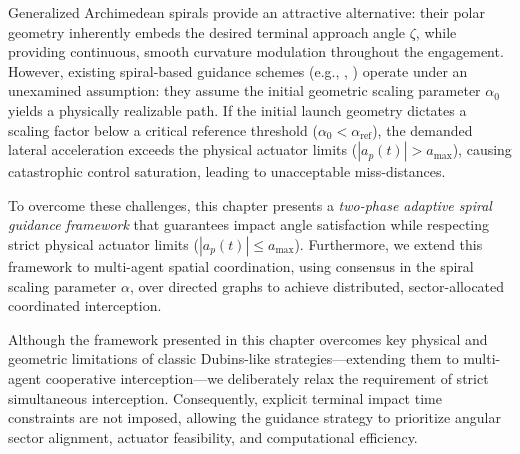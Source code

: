 Generalized Archimedean spirals provide an attractive alternative: their polar geometry inherently embeds the desired terminal approach angle $\zeta$, while providing continuous, smooth curvature modulation throughout the engagement. However, existing spiral-based guidance schemes (e.g., \cite{tripathy2019archimedean}, \cite{mishra2024spiral}) operate under an unexamined assumption: they assume the initial geometric scaling parameter $\alpha_0$ yields a physically realizable path. If the initial launch geometry dictates a scaling factor below a critical reference threshold ($\alpha_0 < \alpha_{\text{ref}}$), the demanded lateral acceleration exceeds the physical actuator limits ($|a_p(t)| > a_{\max}$), causing catastrophic control saturation, leading to unacceptable miss-distances.

To overcome these challenges, this chapter presents a \emph{two-phase adaptive spiral guidance framework} that guarantees impact angle satisfaction while respecting strict physical actuator limits ($|a_p(t)| \le a_{\max}$). Furthermore, we extend this framework to multi-agent spatial coordination, using consensus in the spiral scaling parameter $\alpha$, over directed graphs to achieve distributed, sector-allocated coordinated interception. 

Although the framework presented in this chapter overcomes key physical and geometric limitations of classic Dubins-like strategies—extending them to multi-agent cooperative interception—we deliberately relax the requirement of strict simultaneous interception. Consequently, explicit terminal impact time constraints are not imposed, allowing the guidance strategy to prioritize angular sector alignment, actuator feasibility, and computational efficiency.

